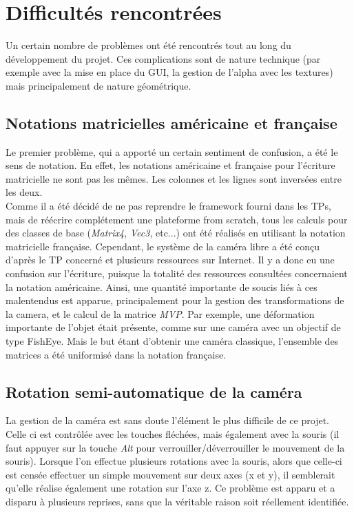 \chapter{Difficultés rencontrées}

Un certain nombre de problèmes ont été rencontrés tout au long du développement
du projet. Ces complications sont de nature technique (par exemple avec la mise
en place du GUI, la gestion de l'alpha avec les textures) mais principalement de
nature géométrique.

\section{Notations matricielles américaine et française}

Le premier problème, qui a apporté un certain sentiment de confusion, a été le
sens de notation. En effet, les notations américaine et française pour
l'écriture matricielle ne sont pas les mêmes. Les colonnes et les lignes sont
inversées entre les deux.\\

Comme il a été décidé de ne pas reprendre le framework fourni dans les TPs, mais
de réécrire complétement une plateforme from scratch, tous les calculs pour des 
classes de base (\emph{Matrix4}, \emph{Vec3}, etc...) ont été réalisés en utilisant la
notation matricielle française. Cependant, le système de la caméra libre a été
conçu d'après le TP concerné et plusieurs ressources sur Internet. Il y a donc
eu une confusion sur l'écriture, puisque la totalité des ressources consultées 
concernaient la notation américaine. Ainsi, une quantité importante de soucis
liés à ces malentendus est apparue, principalement pour la gestion des
transformations de la camera, et le calcul de la matrice \emph{MVP}. Par exemple, une
déformation importante de l'objet était présente, comme sur une caméra avec un
objectif de type FishEye. Mais le but étant d'obtenir une caméra classique,
l'ensemble des matrices a été uniformisé dans la notation française.

\section{Rotation semi-automatique de la caméra}

La gestion de la caméra est sans doute l'élément le plus difficile de ce projet.
Celle ci est contrôlée avec les touches fléchées, mais également avec la souris
(il faut appuyer sur la touche \emph{Alt} pour verrouiller/déverrouiller le
mouvement de la souris). Lorsque l'on effectue plusieurs rotations avec la
souris, alors que celle-ci est censée effectuer un simple mouvement sur deux
axes (x et y), il semblerait qu'elle réalise également une rotation sur l'axe z.
Ce problème est apparu et a disparu à plusieurs reprises, sans que la véritable
raison soit réellement identifiée.

